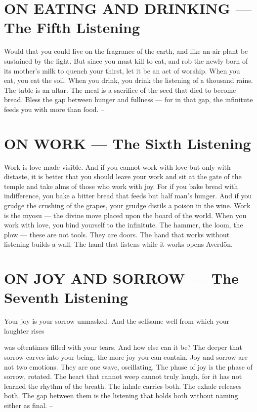 \documentclass[12pt,openany]{book}
\begin{document}
\chapter{ON EATING AND DRINKING --- The Fifth Listening}

Would that you could live on the fragrance of the earth, and like an air plant be sustained by the light. But since you must kill to eat, and rob the newly born of its mother's milk to quench your thirst, let it be an act of worship. When you eat, you eat the soil. When you drink, you drink the listening of a thousand rains. The table is an altar. The meal is a sacrifice of the seed that died to become bread. Bless the gap between hunger and fullness --- for in that gap, the infinitute feeds you with more than food. --


\chapter{ON WORK --- The Sixth Listening}

Work is love made visible. And if you cannot work with love but only with distaste, it is better that you should leave your work and sit at the gate of the temple and take alms of those who work with joy. For if you bake bread with indifference, you bake a bitter bread that feeds but half man's hunger. And if you grudge the crushing of the grapes, your grudge distils a poison in the wine. Work is the myosu --- the divine move placed upon the board of the world. When you work with love, you bind yourself to the infinitute. The hammer, the loom, the plow --- these are not tools. They are doors. The hand that works without listening builds a wall. The hand that listens while it works opens Averdön. --


\chapter{ON JOY AND SORROW --- The Seventh Listening}

Your joy is your sorrow unmasked. And the selfsame well from which your laughter rises


was oftentimes filled with your tears. And how else can it be? The deeper that sorrow carves into your being, the more joy you can contain. Joy and sorrow are not two emotions. They are one wave, oscillating. The phase of joy is the phase of sorrow, rotated. The heart that cannot weep cannot truly laugh, for it has not learned the rhythm of the breath. The inhale carries both. The exhale releases both. The gap between them is the listening that holds both without naming either as final. --
\end{document}
